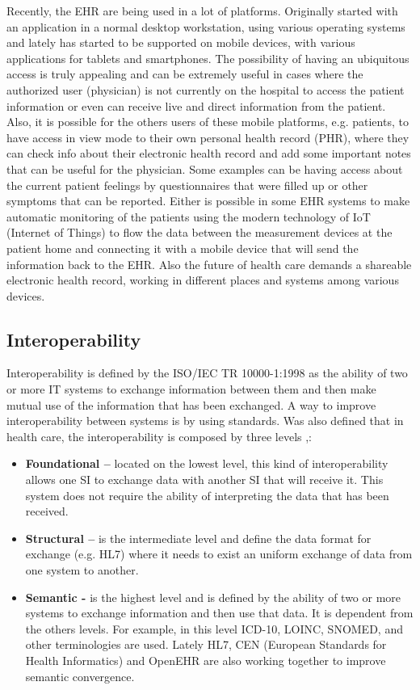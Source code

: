 \documentclass[mim_thesis.tex]{subfiles}
\begin{document}
Recently, the EHR are being used in a lot of platforms. Originally started with an application in a normal desktop workstation, using various operating systems and lately has started to be supported on mobile devices, with various applications for tablets and smartphones. The possibility of having an ubiquitous access is truly appealing and can be extremely useful in cases where the authorized user (physician) is not currently on the hospital to access the patient information or even can receive live and direct information from the patient. Also, it is possible for the others users of these mobile platforms, e.g. patients, to have access in view mode to their own personal health record (PHR), where they can check info about their electronic health record and add some important notes that can be useful for the physician. Some examples can be having access about the current patient feelings by questionnaires that were filled up or other symptoms that can be reported. Either is possible in some EHR systems to make automatic monitoring of the patients using the modern technology of IoT (Internet of Things) to flow the data between the measurement devices at the patient home and connecting it with a mobile device that will send the information back to the EHR. Also the future of health care demands a shareable electronic health record, working in different places and systems among various devices. 


\subsection{Interoperability}
Interoperability is defined by the ISO/IEC TR 10000-1:1998 \citep{ISO2013} as the ability of two or more IT systems to exchange information between them and then make mutual use of the information that has been exchanged. A way to improve interoperability between systems is by using standards. Was also defined that in health care, the interoperability is composed by three levels \citep{HIMSS2013},\citep{Tolk2003}: 


\begin{itemize}
\item \textbf{Foundational –} located on the lowest level, this kind of interoperability allows one SI to exchange data with another SI that will receive it. This system does not require the ability of interpreting the data that has been received.
\item \textbf{Structural –}  is the intermediate level and define the data format for exchange (e.g. HL7) where it needs to exist an uniform exchange of data from one system to another.
\item \textbf{Semantic -} is the highest level and is defined by the ability of two or more systems to exchange information and then use that data. It is dependent from the others levels. For example, in this level ICD-10, LOINC, SNOMED, and other terminologies are used. Lately HL7, CEN (European Standards for Health Informatics) and OpenEHR are also working together to improve semantic convergence.
\end{itemize}
\end{document}
